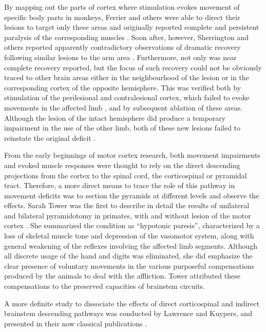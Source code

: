 By mapping out the parts of cortex where stimulation evokes movement of specific body parts in monkeys, Ferrier and others were able to direct their lesions to target only these areas and originally reported complete and persistent paralysis of the corresponding muscles \cite{Ferrier1884}. Soon after, however, Sherrington and others reported apparently contradictory observations of dramatic recovery following similar lesions to the arm area \cite{GrahamBrown1913,Leyton1917}. Furthermore, not only was near complete recovery reported, but the focus of such recovery could not be obviously traced to other brain areas either in the neighbourhood of the lesion or in the corresponding cortex of the opposite hemisphere. This was verified both by stimulation of the perilesional and contralesional cortex, which failed to evoke movements in the affected limb \cite{Leyton1917}, and by subsequent ablation of these areas. Although the lesion of the intact hemisphere did produce a temporary impairment in the use of the other limb, both of these new lesions failed to reinstate the original deficit \cite{GrahamBrown1913,Leyton1917}.

From the early beginnings of motor cortex research, both movement impairments and evoked muscle responses were thought to rely on the direct descending projections from the cortex to the spinal cord, the corticospinal or pyramidal tract. Therefore, a more direct means to trace the role of this pathway in movement deficits was to section the pyramids at different levels and observe the effects. Sarah Tower was the first to describe in detail the results of unilateral and bilateral pyramidotomy in primates, with and without lesion of the motor cortex \cite{Tower1940}. She summarized the condition as ``hypotonic paresis'', characterized by a loss of skeletal muscle tone and depression of the vasomotor system, along with general weakening of the reflexes involving the affected limb segments. Although all discrete usage of the hand and digits was eliminated, she did emphasize the clear presence of voluntary movements in the various purposeful compensations produced by the animals to deal with the affliction. Tower attributed these compensations to the preserved capacities of brainstem circuits.

A more definite study to dissociate the effects of direct corticospinal and indirect brainstem descending pathways was conducted by Lawrence and Kuypers, and presented in their now classical publications \cite{Lawrence1968,Lawrence1968a}.

